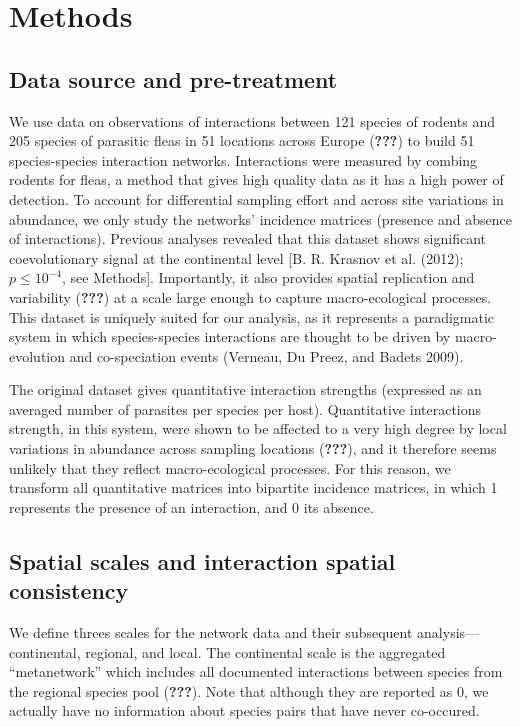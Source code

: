 \documentclass[12pt]{article}
\begin{document}
\section{Methods}\label{methods}

\subsection{Data source and
pre-treatment}\label{data-source-and-pre-treatment}

We use data on observations of interactions between 121 species of
rodents and 205 species of parasitic fleas in 51 locations across Europe
({\textbf{???}}) to build 51 species-species interaction networks.
Interactions were measured by combing rodents for fleas, a method that
gives high quality data as it has a high power of detection. To account
for differential sampling effort and across site variations in
abundance, we only study the networks' incidence matrices (presence and
absence of interactions). Previous analyses revealed that this dataset
shows significant coevolutionary signal at the continental level {[}B.
R. Krasnov et al. (2012); \(p \leq 10^{-4}\), see Methods{]}.
Importantly, it also provides spatial replication and variability
({\textbf{???}}) at a scale large enough to capture macro-ecological
processes. This dataset is uniquely suited for our analysis, as it
represents a paradigmatic system in which species-species interactions
are thought to be driven by macro-evolution and co-speciation events
(Verneau, Du Preez, and Badets 2009).

The original dataset gives quantitative interaction strengths (expressed
as an averaged number of parasites per species per host). Quantitative
interactions strength, in this system, were shown to be affected to a
very high degree by local variations in abundance across sampling
locations ({\textbf{???}}), and it therefore seems unlikely that they
reflect macro-ecological processes. For this reason, we transform all
quantitative matrices into bipartite incidence matrices, in which 1
represents the presence of an interaction, and 0 its absence.

\subsection{Spatial scales and interaction spatial
consistency}\label{spatial-scales-and-interaction-spatial-consistency}

We define threes scales for the network data and their subsequent
analysis---continental, regional, and local. The continental scale is
the aggregated ``metanetwork'' which includes all documented
interactions between species from the regional species pool
({\textbf{???}}). Note that although they are reported as 0, we actually
have no information about species pairs that have never co-occured.
\end{document}
